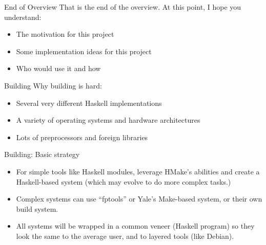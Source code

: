 \documentclass[pdf,rico,slideColor,colorBG]{prosper}
\begin{document}
\begin{slide}{End of Overview}
That is the end of the overview. At this point, I hope you understand:	
\begin{itemize}
  \item The motivation for this project
  \item Some implementation ideas for this project
  \item Who would use it and how
\end{itemize}
\end{slide}


\begin{slide}{Building}
Why building is hard:
\begin{itemize}
  \item Several very different Haskell implementations
  \item A variety of operating systems and hardware architectures
  \item Lots of preprocessors and foreign libraries
\end{itemize}
\end{slide}

\begin{slide}{Building: Basic strategy}
\begin{itemize}
  \item For simple tools like Haskell modules, leverage HMake's
  abilities and create a Haskell-based system (which may evolve to do
  more complex tasks.)

  \item Complex systems can use ``fptools'' or Yale's Make-based
  system, or their own build system.

  \item All systems will be wrapped in a common veneer (Haskell
  program) so they look the same to the average user, and to layered
  tools (like Debian).

\end{itemize}
\end{slide}
\end{document}
